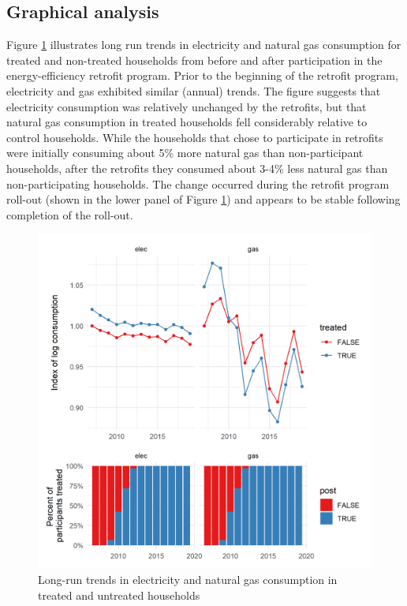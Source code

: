 \documentclass{article}
\begin{document}
\subsection{Graphical analysis}
Figure \ref{fig_agg} illustrates long run trends in electricity and natural gas consumption for treated and non-treated households from before and after participation in the energy-efficiency retrofit program. Prior to the beginning of the retrofit program, electricity and gas exhibited similar (annual) trends. The figure suggests that electricity consumption was relatively unchanged by the retrofits, but that natural gas consumption in treated households fell considerably relative to control households. While the households that chose to participate in retrofits were initially consuming about 5\% more natural gas than non-participant households, after the retrofits they consumed about 3-4\% less natural gas than non-participating households. The change occurred during the retrofit program roll-out (shown in the lower panel of Figure \ref{fig_agg}) and appears to be stable following completion of the roll-out.

\begin{figure}
	\includegraphics{../output_figures_tables/aggregate_trend_graph}
	\caption{Long-run trends in electricity and natural gas consumption in treated and untreated households}\label{fig_agg}
\end{figure}
\end{document}
